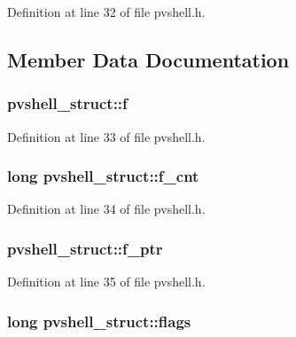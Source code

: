 Definition at line 32 of file pvshell.\+h.



\subsection{Member Data Documentation}
\subsubsection[{\texorpdfstring{f}{f}}]{ pvshell\+\_\+struct\+::f}\hypertarget{structpvshell__struct_a5af3be8603e108a163e017a1cf5a7d7f}{}\label{structpvshell__struct_a5af3be8603e108a163e017a1cf5a7d7f}


Definition at line 33 of file pvshell.\+h.

\subsubsection[{\texorpdfstring{f\+\_\+cnt}{f_cnt}}]{\setlength{\rightskip}{0pt plus 5cm}long pvshell\+\_\+struct\+::f\+\_\+cnt}\hypertarget{structpvshell__struct_a07873e37cb14ce9e4d14cef2e2e78897}{}\label{structpvshell__struct_a07873e37cb14ce9e4d14cef2e2e78897}


Definition at line 34 of file pvshell.\+h.

\subsubsection[{\texorpdfstring{f\+\_\+ptr}{f_ptr}}]{ pvshell\+\_\+struct\+::f\+\_\+ptr}\hypertarget{structpvshell__struct_af12d5a7427471dd6b17c57a0531f038c}{}\label{structpvshell__struct_af12d5a7427471dd6b17c57a0531f038c}


Definition at line 35 of file pvshell.\+h.

\subsubsection[{\texorpdfstring{flags}{flags}}]{\setlength{\rightskip}{0pt plus 5cm}long pvshell\+\_\+struct\+::flags}\hypertarget{structpvshell__struct_ad3e2e526c433ea8cc6ba1e500ece9020}{}\label{structpvshell__struct_ad3e2e526c433ea8cc6ba1e500ece9020}


